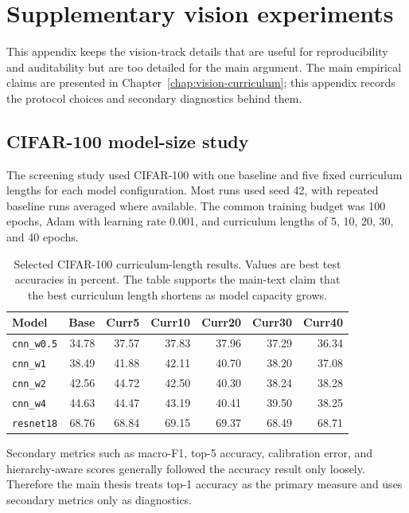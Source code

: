 \chapter{Supplementary vision experiments}
\label{app:supplementary-vision-experiments}

This appendix keeps the vision-track details that are useful for reproducibility
and auditability but are too detailed for the main argument. The main empirical
claims are presented in Chapter~\ref{chap:vision-curriculum}; this appendix
records the protocol choices and secondary diagnostics behind them.

\section{CIFAR-100 model-size study}
\label{app:cifar100-model-size-curriculum}

The screening study used CIFAR-100 with one baseline and five fixed curriculum
lengths for each model configuration. Most runs used seed 42, with repeated
baseline runs averaged where available. The common training budget was 100
epochs, Adam with learning rate 0.001, and curriculum lengths of 5, 10, 20, 30,
and 40 epochs.

\begin{table}[h]
\centering
\small
\begin{tabular}{lrrrrrr}
\toprule
Model & Base & Curr5 & Curr10 & Curr20 & Curr30 & Curr40 \\
\midrule
\texttt{cnn\_w0.5} & 34.78 & 37.57 & 37.83 & 37.96 & 37.29 & 36.34 \\
\texttt{cnn\_w1} & 38.49 & 41.88 & 42.11 & 40.70 & 38.20 & 37.08 \\
\texttt{cnn\_w2} & 42.56 & 44.72 & 42.50 & 40.30 & 38.24 & 38.28 \\
\texttt{cnn\_w4} & 44.63 & 44.47 & 43.19 & 40.41 & 39.50 & 38.25 \\
\texttt{resnet18} & 68.76 & 68.84 & 69.15 & 69.37 & 68.49 & 68.71 \\
\bottomrule
\end{tabular}
\caption{Selected CIFAR-100 curriculum-length results. Values are best test
accuracies in percent. The table supports the main-text claim that the best
curriculum length shortens as model capacity grows.}
\label{tab:app-cifar100-lengths-compact}
\end{table}

Secondary metrics such as macro-F1, top-5 accuracy, calibration error, and
hierarchy-aware scores generally followed the accuracy result only loosely.
Therefore the main thesis treats top-1 accuracy as the primary measure and uses
secondary metrics only as diagnostics.

